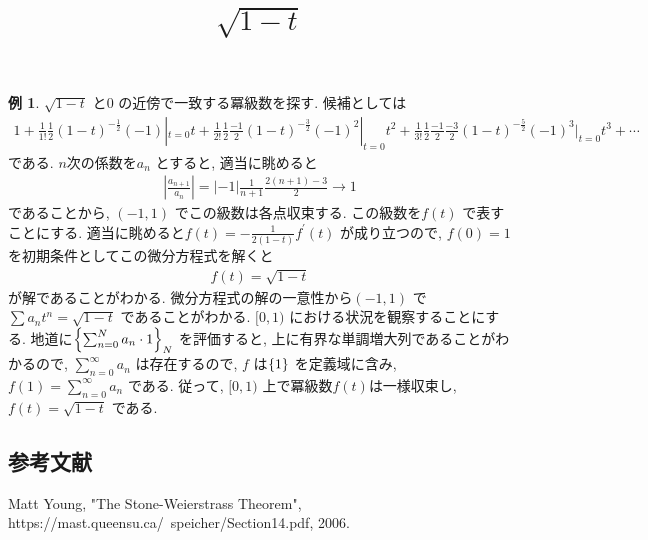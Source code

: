 \documentclass[10pt, fleqn, label-section=none]{bxjsarticle}
\title{$\sqrt{1-t}$}
\date{}
\author{}
\theoremstyle{definition}
\newtheorem{ex}[dfn]{例}
\newcommand{\cbra}[1]{\mleft\{#1\mright\}}
\newcommand{\abs}[1]{\left|#1\right|}
\renewcommand{\;}{\, ; \,}
\begin{document}
\maketitle



\section{}

\subsection{}

\begin{ex}
$\sqrt{1-t}$ と$0$ の近傍で一致する冪級数を探す. 候補としては
\begin{align*} 1 + \frac{1}{1!} \frac{1}{2} (1-t)^{-\frac{1}{2}} (-1) |_{t = 0} t +  \frac{1}{2!} \frac{1}{2} \frac{-1}{2} (1-t)^{-\frac{3}{2}} (-1)^2  |_{t = 0}  t^2 + \frac{1}{3!} \frac{1}{2} \frac{-1}{2} \frac{-3}{2}(1-t)^{-\frac{5}{2}} (-1)^3  |_{t = 0}  t^3 + \cdots   \end{align*}
である. $n$次の係数を$a_n$ とすると, 適当に眺めると
\begin{align*} \abs{\frac{a_{n+1}}{a_n}} =  \abs{-1} \frac{1}{n+1} \frac{2(n+1) -3}{2} \rightarrow 1\end{align*}
であることから, $(-1, 1)$ でこの級数は各点収束する.  この級数を$f(t)$ で表すことにする. 適当に眺めると$f(t) = -\frac{1}{2 (1-t)} f^\prime(t)$ が成り立つので, $f(0) = 1$ を初期条件としてこの微分方程式を解くと
\begin{align*} f(t) = \sqrt{1-t}\end{align*}
が解であることがわかる. 微分方程式の解の一意性から$(-1,1)$ で$\sum a_n t^n = \sqrt{1-t}$ であることがわかる. $[0,1)$ における状況を観察することにする. 地道に$\cbra{\sum_{n=0}^{N} a_n \cdot 1}_N$ を評価すると, 上に有界な単調増大列であることがわかるので, $\sum_{n=0}^\infty a_n$ は存在するので, $f$ は$\cbra{1}$ を定義域に含み, $f(1) = \sum_{n=0}^\infty a_n$ である. 従って, $[0, 1)$ 上で冪級数$f(t)$は一様収束し, $f(t) = \sqrt{1-t}$ である. 
\end{ex}

\subsection{参考文献}

Matt Young, "The Stone-Weierstrass Theorem", https://mast.queensu.ca/~speicher/Section14.pdf, 2006.
\end{document}
